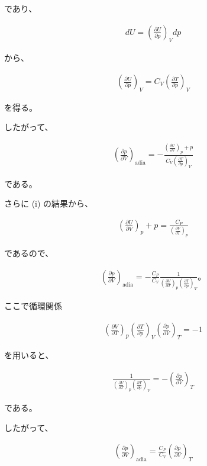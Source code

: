 \documentclass[platex,dvipdfmx,a4paper]{jsarticle}
\begin{document}
であり、

\begin{align*}
dU
=
\left(\frac{\partial U}{\partial p}\right)_Vdp
\end{align*}

から、

\begin{align*}
\left(\frac{\partial U}{\partial p}\right)_V
=
C_V
\left(\frac{\partial T}{\partial p}\right)_V
\end{align*}

を得る。

したがって、

\begin{align*}
\left(\frac{\partial p}{\partial V}\right)_{\mathrm{adia}}
=
-
\frac{
\left(\frac{\partial U}{\partial V}\right)_p+p
}{
C_V
\left(\frac{\partial T}{\partial p}\right)_V
}
\end{align*}

である。

さらに (i) の結果から、

\begin{align*}
\left(\frac{\partial U}{\partial V}\right)_p+p
=
\frac{
C_P
}{
\left(\frac{\partial V}{\partial T}\right)_p
}
\end{align*}

であるので、

\begin{align*}
\left(\frac{\partial p}{\partial V}\right)_{\mathrm{adia}}
=
-
\frac{C_P}
{C_V}
\frac{1}
{
\left(\frac{\partial V}{\partial T}\right)_p
\left(\frac{\partial T}{\partial p}\right)_V
}。
\end{align*}

ここで循環関係

\begin{align*}
\left(\frac{\partial V}{\partial T}\right)_p
\left(\frac{\partial T}{\partial p}\right)_V
\left(\frac{\partial p}{\partial V}\right)_T
=
-1
\end{align*}

を用いると、

\begin{align*}
\frac{1}
{
\left(\frac{\partial V}{\partial T}\right)_p
\left(\frac{\partial T}{\partial p}\right)_V
}
=
-
\left(\frac{\partial p}{\partial V}\right)_T
\end{align*}

である。

したがって、

\begin{align*}
\left(\frac{\partial p}{\partial V}\right)_{\mathrm{adia}}
=
\frac{C_P}{C_V}
\left(\frac{\partial p}{\partial V}\right)_T
\end{align*}
\end{document}
